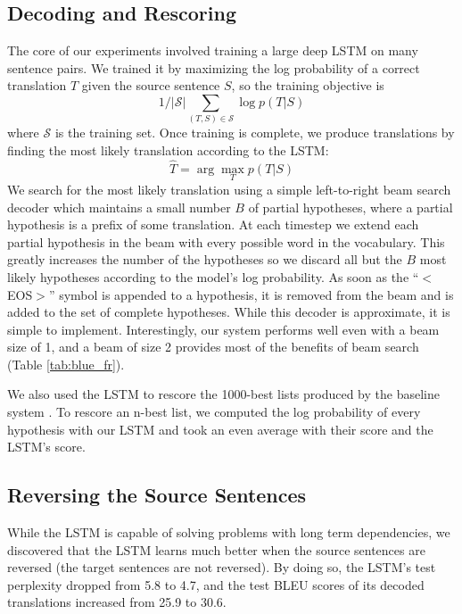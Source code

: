 \subsection{Decoding and Rescoring}

The core of our experiments involved training a large deep LSTM on
many sentence pairs. We trained it by maximizing the log
probability of a correct translation $T$ given the source sentence
$S$, so the training objective is
$$1/|\mathcal S|\sum_{(T,S)\in\mathcal S}\log p(T|S)$$ where $\mathcal
S$ is the training set.  Once training is complete, we produce
translations by finding the most likely translation according to
the LSTM:
\begin{equation}
\label{eqn:decode}
\hat{T} = \arg\max_T p(T|S)
\end{equation}
We search for the most likely translation using a simple left-to-right
beam search decoder which maintains a small number $B$ of partial
hypotheses, where a partial hypothesis is a prefix of some
translation.  At each timestep we extend each partial hypothesis in
the beam with every possible word in the vocabulary. This greatly
increases the number of the hypotheses so we discard all but the $B$
most likely hypotheses according to the model's log probability.  As soon
as the ``$<$EOS$>$'' symbol is appended to a hypothesis, it is removed from
the beam and is added to the set of complete hypotheses.  While this
decoder is approximate, it is simple to implement.  Interestingly, our
system performs well even with a beam size of 1, and a beam of
size 2 provides most of the benefits of beam search (Table
\ref{tab:blue_fr}).   


We also used the LSTM to rescore the 1000-best lists produced by the
baseline system \cite{wmt14_en_fr}.  To rescore an n-best list, we
computed the log probability of every hypothesis with our LSTM and
took an even average with their score and the LSTM's score.

\subsection{Reversing the Source Sentences}
\label{sec:rev_rev}

While the LSTM is capable of solving problems with long term
dependencies, we discovered that the LSTM learns much better when the
source sentences are reversed (the target sentences are not reversed).  By
doing so, the LSTM's test perplexity dropped from 5.8 to 4.7, and the 
test BLEU scores of its decoded translations increased from 25.9 to 30.6.



